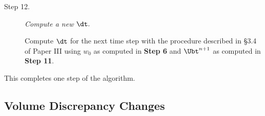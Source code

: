 \begin{description}
\item[Step 12.] {\em Compute a new $\dt.$}

Compute $\dt$ for the next time step with the procedure described in
\S 3.4 of Paper III using $w_0$ as computed in {\bf Step 6} and $\Ubt^{n+1}$
as computed in {\bf Step 11}.

\end{description}

\noindent This completes one step of the algorithm.



\subsection{Volume Discrepancy Changes}
